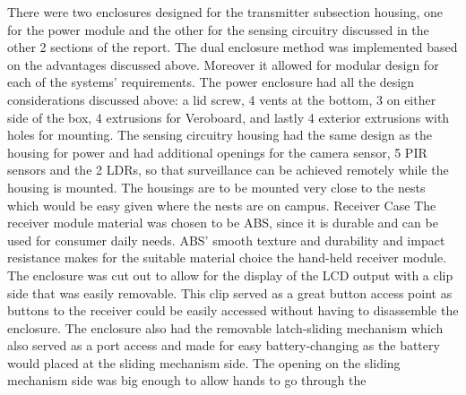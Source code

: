 \documentclass[class=report,11pt,crop=false]{standalone}
\begin{document}
There were two enclosures designed for the transmitter subsection housing, one for the power module and the other for the sensing circuitry discussed in the other 2 sections of the report. The dual enclosure method was implemented based on the advantages discussed above. Moreover it allowed for modular design for each of the systems’ requirements. 
The power enclosure had all the design considerations discussed above: a lid screw, 4 vents at the bottom, 3 on either side of the box, 4 extrusions for Veroboard, and lastly 4 exterior extrusions with holes for mounting.
The sensing circuitry housing had the same design as the housing for power and had additional openings for the camera sensor, 5 PIR sensors and the 2 LDRs, so that surveillance can be achieved remotely while the housing is mounted. The housings are to be mounted very close to the nests which would be easy given where the nests are on campus. 
Receiver Case
The receiver module material was chosen to be ABS, since it is durable and can be used for consumer daily needs. ABS’ smooth texture and durability and impact resistance makes for the suitable material choice the hand-held receiver module. 
The enclosure was cut out to allow for the display of the LCD output with a clip side that was easily removable. This clip served as a great button access point as buttons to the receiver could be easily accessed without having to disassemble the enclosure. 
The enclosure also had the removable latch-sliding mechanism which also served as a port access and made for easy battery-changing as the battery would placed at the sliding mechanism side. The opening on the sliding mechanism side was big enough to allow hands to go through the  

\ifstandalone

\printnoidxglossary[type=\acronymtype,nonumberlist]
\fi
\end{document}
